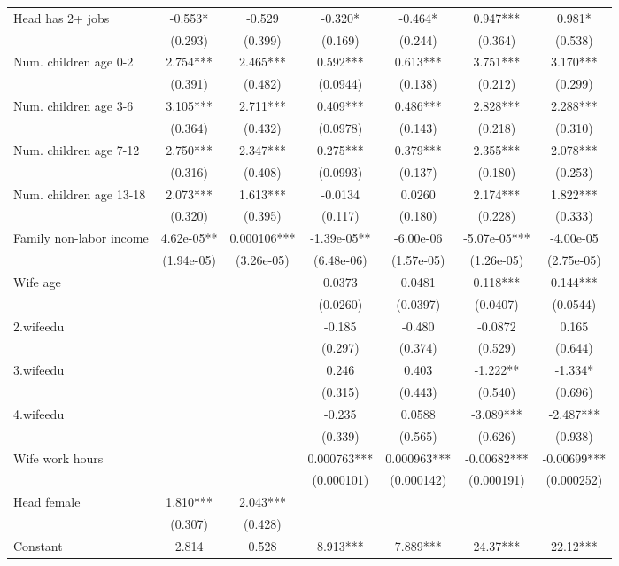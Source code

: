 \begin{tabular}{lcccccc}
Head has 2+ jobs & -0.553* & -0.529 & -0.320* & -0.464* & 0.947*** & 0.981* \\
 & (0.293) & (0.399) & (0.169) & (0.244) & (0.364) & (0.538) \\
Num. children age 0-2 & 2.754*** & 2.465*** & 0.592*** & 0.613*** & 3.751*** & 3.170*** \\
 & (0.391) & (0.482) & (0.0944) & (0.138) & (0.212) & (0.299) \\
Num. children age 3-6 & 3.105*** & 2.711*** & 0.409*** & 0.486*** & 2.828*** & 2.288*** \\
 & (0.364) & (0.432) & (0.0978) & (0.143) & (0.218) & (0.310) \\
Num. children age 7-12 & 2.750*** & 2.347*** & 0.275*** & 0.379*** & 2.355*** & 2.078*** \\
 & (0.316) & (0.408) & (0.0993) & (0.137) & (0.180) & (0.253) \\
Num. children age 13-18 & 2.073*** & 1.613*** & -0.0134 & 0.0260 & 2.174*** & 1.822*** \\
 & (0.320) & (0.395) & (0.117) & (0.180) & (0.228) & (0.333) \\
Family non-labor income & 4.62e-05** & 0.000106*** & -1.39e-05** & -6.00e-06 & -5.07e-05*** & -4.00e-05 \\
 & (1.94e-05) & (3.26e-05) & (6.48e-06) & (1.57e-05) & (1.26e-05) & (2.75e-05) \\
Wife age &  &  & 0.0373 & 0.0481 & 0.118*** & 0.144*** \\
 &  &  & (0.0260) & (0.0397) & (0.0407) & (0.0544) \\
2.wifeedu &  &  & -0.185 & -0.480 & -0.0872 & 0.165 \\
 &  &  & (0.297) & (0.374) & (0.529) & (0.644) \\
3.wifeedu &  &  & 0.246 & 0.403 & -1.222** & -1.334* \\
 &  &  & (0.315) & (0.443) & (0.540) & (0.696) \\
4.wifeedu &  &  & -0.235 & 0.0588 & -3.089*** & -2.487*** \\
 &  &  & (0.339) & (0.565) & (0.626) & (0.938) \\
Wife work hours &  &  & 0.000763*** & 0.000963*** & -0.00682*** & -0.00699*** \\
 &  &  & (0.000101) & (0.000142) & (0.000191) & (0.000252) \\
Head female & 1.810*** & 2.043*** &  &  &  &  \\
 & (0.307) & (0.428) &  &  &  &  \\
Constant & 2.814 & 0.528 & 8.913*** & 7.889*** & 24.37*** & 22.12*** \\

\end{tabular}
